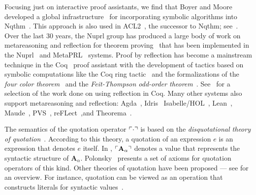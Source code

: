 \documentclass[fleqn]{llncs}
\begin{document}
Focusing just on interactive proof assistants, we find
that Boyer and Moore developed a global
infrastructure~\cite{BoyerMoore81} for
incorporating symbolic algorithms into Nqthm~\cite{BoyerMoore88}.
This approach is also used in
ACL2~\cite{KaufmannMoore97}, the successor to Nqthm;
see~\cite{HuntEtAl05}.  Over the last 30 years, the Nuprl group
has produced a large body of work on metareasoning
and reflection for theorem
proving~\cite{AllenEtAl90,Barzilay05,Constable95,Howe92,KnoblockConstable86,Nogin05,Yu07}
that has been implemented in the Nuprl~\cite{Constable86} and
MetaPRL~\cite{HickeyEtAl03} systems.  Proof by reflection has become a
mainstream technique in the Coq~\cite{Coq8.5} proof assistant with the
development of tactics based on symbolic computations like the Coq
ring tactic~\cite{Boutin97,GregoireMahboubi05} and the formalizations
of the \emph{four color theorem}~\cite{Gonthier08} and the
\emph{Feit-Thompson odd-order theorem}~\cite{GonthierEtAl13}.
See~\cite{Boutin97,BraibantPous11,Chlipala13,gonthier2010introduction,GregoireMahboubi05,JamesHinze09,OostdijkGeuvers02}
for a selection of the work done on using reflection in Coq.
Many other systems also support metareasoning and reflection:
Agda~\cite{Norell09,VanDerWalt12,VanDerWaltSwierstra12},
Idris~\cite{Christiansen:2014,Christiansen:2016,Christiansen:2016:Thesis}
Isabelle/HOL~\cite{ChaiebNipkow08},
Lean~\cite{ebner2017metaprogramming},
Maude~\cite{ClavelMeseguer02}, 
PVS~\cite{VonHenkeEtAl98}, 
reFLect~\cite{GrundyEtAl06,MelhamEtAl13},and
Theorema~\cite{BuchbergerEtAl06,GieseBuchberger07}.

The semantics of the quotation operator $\ulcorner\cdot\urcorner$ is based on
the \emph{disquotational theory of quotation}~\cite{Quotation12}.
According to this theory, a quotation of an expression $e$ is an
expression that denotes $e$ itself.  In {\churchqe},
$\ulcorner\textbf{A}_\alpha\urcorner$ denotes a value that represents the
syntactic structure of $\textbf{A}_\alpha$.  Polonsky~\cite{Polonsky11} 
presents a set of axioms for quotation operators of this
kind.  Other theories of quotation have been proposed --- see
\cite{Quotation12} for an overview.  For instance, quotation can be viewed as
an operation that constructs literals for syntactic values~\cite{Rabe15}.
\end{document}
